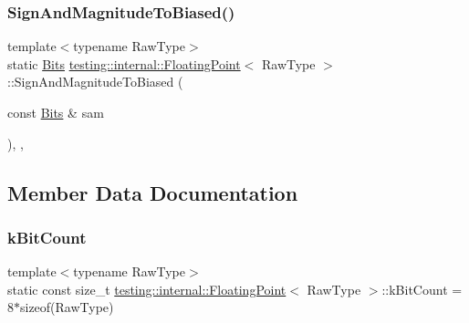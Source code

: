 \mbox{\label{classtesting_1_1internal_1_1_floating_point_a2cf0e39c6ebf026bc0353100d031ca85}} 
\subsubsection{\texorpdfstring{SignAndMagnitudeToBiased()}{SignAndMagnitudeToBiased()}\hspace{0.1cm}{\footnotesize\ttfamily [3/3]}}
{\footnotesize\ttfamily template$<$typename Raw\+Type$>$ \\
static \mbox{\hyperlink{classtesting_1_1internal_1_1_floating_point_abf228bf6cd48f12c8b44c85b4971a731}{Bits}} \mbox{\hyperlink{classtesting_1_1internal_1_1_floating_point}{testing\+::internal\+::\+Floating\+Point}}$<$ Raw\+Type $>$\+::Sign\+And\+Magnitude\+To\+Biased (\begin{DoxyParamCaption}\item[{const \mbox{\hyperlink{classtesting_1_1internal_1_1_floating_point_abf228bf6cd48f12c8b44c85b4971a731}{Bits}} \&}]{sam }\end{DoxyParamCaption})\hspace{0.3cm}{\ttfamily [inline]}, {\ttfamily [static]}, {\ttfamily [private]}}



\subsection{Member Data Documentation}
\mbox{\label{classtesting_1_1internal_1_1_floating_point_ad730b49e322aec20c46ebf017a106afc}} 
\subsubsection{\texorpdfstring{kBitCount}{kBitCount}}
{\footnotesize\ttfamily template$<$typename Raw\+Type$>$ \\
static const size\+\_\+t \mbox{\hyperlink{classtesting_1_1internal_1_1_floating_point}{testing\+::internal\+::\+Floating\+Point}}$<$ Raw\+Type $>$\+::k\+Bit\+Count = 8$\ast$sizeof(Raw\+Type)\hspace{0.3cm}{\ttfamily [static]}}

